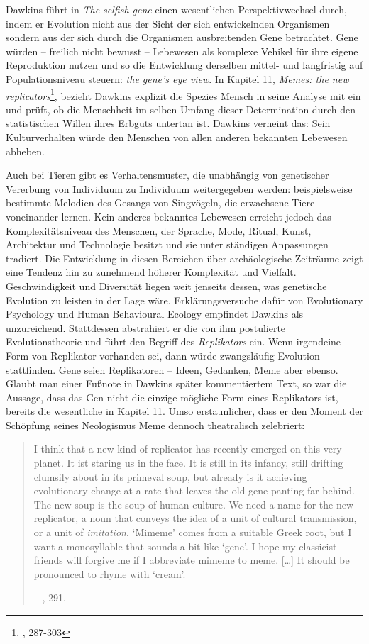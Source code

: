 \documentclass[openany,twoside,twocolumn]{book}
\let\rmarkdownfootnote\footnote%
\def\footnote{\protect\rmarkdownfootnote}
\begin{document}
Dawkins führt in \emph{The selfish gene} einen wesentlichen
Perspektivwechsel durch, indem er Evolution nicht aus der Sicht der sich
entwickelnden Organismen sondern aus der sich durch die Organismen
ausbreitenden Gene betrachtet. Gene würden -- freilich nicht bewusst --
Lebewesen als komplexe Vehikel für ihre eigene Reproduktion nutzen und
so die Entwicklung derselben mittel- und langfristig auf
Populationsniveau steuern: \emph{the gene's eye view}. In Kapitel 11,
\emph{Memes: the new replicators}\footnote{\textcite{Dawkinsselfishgene40th2016},
  287-303}, bezieht Dawkins explizit die Spezies Mensch in seine Analyse
mit ein und prüft, ob die Menschheit im selben Umfang dieser
Determination durch den statistischen Willen ihres Erbguts untertan ist.
Dawkins verneint das: Sein Kulturverhalten würde den Menschen von allen
anderen bekannten Lebewesen abheben.

Auch bei Tieren gibt es Verhaltensmuster, die unabhängig von genetischer
Vererbung von Individuum zu Individuum weitergegeben werden:
beispielsweise bestimmte Melodien des Gesangs von Singvögeln, die
erwachsene Tiere voneinander lernen. Kein anderes bekanntes Lebewesen
erreicht jedoch das Komplexitätsniveau des Menschen, der Sprache, Mode,
Ritual, Kunst, Architektur und Technologie besitzt und sie unter
ständigen Anpassungen tradiert. Die Entwicklung in diesen Bereichen über
archäologische Zeiträume zeigt eine Tendenz hin zu zunehmend höherer
Komplexität und Vielfalt. Geschwindigkeit und Diversität liegen weit
jenseits dessen, was genetische Evolution zu leisten in der Lage wäre.
Erklärungsversuche dafür von Evolutionary Psychology und Human
Behavioural Ecology empfindet Dawkins als unzureichend. Stattdessen
abstrahiert er die von ihm postulierte Evolutionstheorie und führt den
Begriff des \emph{Replikators} ein. Wenn irgendeine Form von Replikator
vorhanden sei, dann würde zwangsläufig Evolution stattfinden. Gene seien
Replikatoren -- Ideen, Gedanken, Meme aber ebenso. Glaubt man einer
Fußnote in Dawkins später kommentiertem Text, so war die Aussage, dass
das Gen nicht die einzige mögliche Form eines Replikators ist, bereits
die wesentliche in Kapitel 11. Umso erstaunlicher, dass er den Moment
der Schöpfung seines Neologismus Meme dennoch theatralisch zelebriert:

\begin{quote}
I think that a new kind of replicator has recently emerged on this very
planet. It ist staring us in the face. It is still in its infancy, still
drifting clumsily about in its primeval soup, but already is it
achieving evolutionary change at a rate that leaves the old gene panting
far behind. The new soup is the soup of human culture. We need a name
for the new replicator, a noun that conveys the idea of a unit of
cultural transmission, or a unit of \emph{imitation}. `Mimeme' comes
from a suitable Greek root, but I want a monosyllable that sounds a bit
like `gene'. I hope my classicist friends will forgive me if I
abbreviate mimeme to meme. {[}\ldots{}{]} It should be pronounced to
rhyme with `cream'.

-- \textcite{Dawkinsselfishgene40th2016}, 291.
\end{quote}
\end{document}
